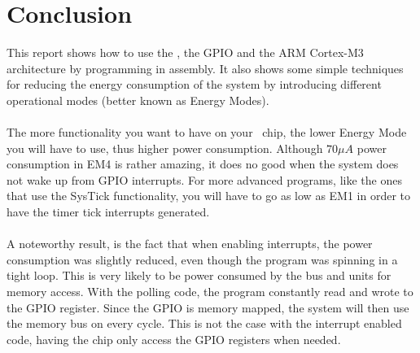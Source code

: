 \section{Conclusion}
This report shows how to use the \boardName, the GPIO and the ARM Cortex-M3 architecture by programming in assembly. It also shows some simple techniques for reducing the energy consumption of the system by introducing different operational modes (better known as Energy Modes). \\
\\
The more functionality you want to have on your \boardName ~chip, the lower Energy Mode you will have to use, thus higher power consumption. Although $70\mu A$ power consumption in EM4 is rather amazing, it does no good when the system does not wake up from GPIO interrupts. For more advanced programs, like the ones that use the SysTick functionality, you will have to go as low as EM1 in order to have the timer tick interrupts generated.\\
\\
A noteworthy result, is the fact that when enabling interrupts, the power consumption was slightly reduced, even though the program was spinning in a tight loop. This is very likely to be power consumed by the bus and units for memory access. With the polling code, the program constantly read and wrote to the GPIO register. Since the GPIO is memory mapped, the system will then use the memory bus on every cycle. This is not the case with the interrupt enabled code, having the chip only access the GPIO registers when needed.

